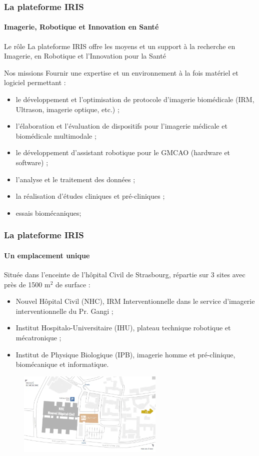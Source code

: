 \begin{frame}
    \frametitle{La plateforme IRIS}
    \framesubtitle{Imagerie, Robotique et Innovation en Santé}
    \begin{block}{Le rôle}
    La plateforme IRIS  offre les moyens et un support à la recherche en Imagerie, en Robotique et l'Innovation pour la Santé
    \end{block}
    \begin{block}{Nos missions}
        Fournir une expertise et un environnement à la fois matériel et logiciel permettant :
        \begin{itemize}
            \item le développement et l'optimisation de protocole d'imagerie biomédicale (IRM, Ultrason, imagerie optique, etc.) ;
            \item l'élaboration et l'évaluation de dispositifs pour l'imagerie médicale et biomédicale multimodale ;
            \item le développement d'assistant robotique pour le GMCAO (hardware et software) ; 
            \item l'analyse et le traitement des données ;
            \item la réalisation d'études cliniques et pré-cliniques ;
            \item essais biomécaniques; 
        \end{itemize}
    \end{block}
\end{frame}
\begin{frame}
    \frametitle{La plateforme IRIS}
    \framesubtitle{Un emplacement unique}
    Située dans l'enceinte de l'hôpital Civil de Strasbourg, répartie sur 3 sites avec près de 1500 m$^2$ de surface :
    \begin{itemize}
        \item Nouvel Hôpital Civil (NHC), IRM Interventionnelle dans le service d'imagerie interventionnelle du Pr. Gangi ;
        \item Institut Hospitalo-Universitaire (IHU), plateau technique robotique et mécatronique ;
        \item Institut de Physique Biologique (IPB), imagerie homme et pré-clinique, biomécanique et informatique.
    \end{itemize}
    \begin{figure}[!h]
        \centering
            \includegraphics[height=4cm]{img/plan-acces.png.png}
    \end{figure}
\end{frame}
